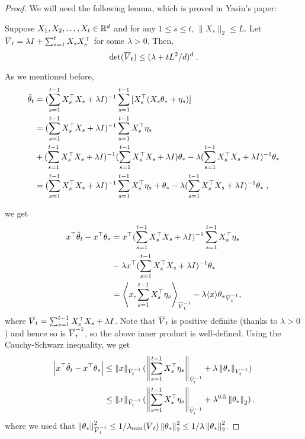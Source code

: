 \begin{proof}
We will need the following lemma, which is proved in Yasin's paper:

\begin{lemma}
\label{lemma:determinant-trace-inequality}
Suppose $X_1, X_2, \dots, X_t \in \mathbb{R}^d$ and for any $1 \le s \le t$, $\|X_s\|_2 \le L$.
Let $\overline{V}_t = \lambda I + \sum_{s=1}^t X_s X_s^\top$ for some $\lambda > 0$.
Then,
$$
\det(\overline{V}_t) \le (\lambda + tL^2/d)^d \; .
$$
\end{lemma}

As we mentioned before,
\begin{align*}
\hat{\theta}_t
&= (\sum_{s=1}^{t-1}{X_s^\top X_s} + \lambda I )^{-1} \sum_{s=1}^{t-1}{[X_s^\top (X_s \theta_* + \eta_s)]} \\
&= (\sum_{s=1}^{t-1}{X_s^\top X_s} + \lambda I )^{-1} \sum_{s=1}^{t-1}{X_s^\top \eta_s} \\
&+ (\sum_{s=1}^{t-1}{X_s^\top X_s} + \lambda I )^{-1} (\sum_{s=1}^{t-1}{X_s^\top X_s+\lambda I}) \theta_* - \lambda (\sum_{s=1}^{t-1}{X_s^\top X_s} + \lambda I )^{-1}  \theta_* \\
&= (\sum_{s=1}^{t-1}{X_s^\top X_s} + \lambda I )^{-1} \sum_{s=1}^{t-1}{X_s^\top \eta_s} + \theta_* - \lambda (\sum_{s=1}^{t-1}{X_s^\top X_s} + \lambda I )^{-1}  \theta_* \; ,
\end{align*}

we get
\begin{align*}
x^\top \hat{\theta}_t - x^\top \theta_*
&= x^\top (\sum_{s=1}^{t-1}{X_s^\top X_s} + \lambda I )^{-1} \sum_{s=1}^{t-1}{X_s^\top \eta_s} \\
&- \lambda x^\top (\sum_{s=1}^{t-1}{X_s^\top X_s} + \lambda I )^{-1}  \theta_* \\
&= \left\langle x, \sum_{s=1}^{t-1}{X_s^\top \eta_s} \right\rangle_{\overline{V}_t^{-1}} - \lambda \langle x \rangle{\theta_*}_{\overline{V}_t^{-1}},
\end{align*}
where $\overline{V}_t = \sum_{s=1}^{t-1}{X_s^\top X_s} + \lambda I $.
Note that $\overline{V}_t$ is positive definite (thanks to $\lambda>0$) and hence so is $\overline{V}_t^{-1}$, so the above inner product is well-defined.
Using the Cauchy-Schwarz inequality, we get
\begin{align*}
  \left|x^\top \hat{\mathbf{\theta}}_t - x^\top \theta_*\right|
  &\leq \left\|x\right\|_{\bar{V}_t^{-1}} (\left\|\sum_{s=1}^{t-1}{X_s^\top \mathbf{\eta}_s}\right\|_{\bar{V}_t^{-1}} + \lambda \left\|\theta_*\right\|_{V_t^{-1}}) \\
  &\leq \left\|x\right\|_{\bar{V}_t^{-1}} (\left\|\sum_{s=1}^{t-1}{X_s^\top \mathbf{\eta}_s}\right\|_{\bar{V}_t^{-1}} + \lambda^{0.5} \left\|\theta_*\right\|_2) \,.
\end{align*}
where we used that $\left\|\theta_*\right\|_{\overline{V}_t^{-1}}^2 \le 1/\lambda_{\min}(\overline{V}_t) \left\|\theta_*\right\|_2^2 \le 1/\lambda \left\|\theta_*\right\|_2^2$.


\end{proof}

